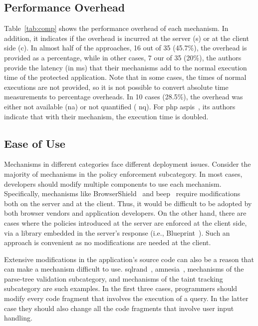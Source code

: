 \documentclass[conference]{IEEEtran}
\begin{document}
\subsection{Performance Overhead}

Table~\ref{tab:comp} shows the performance overhead of each mechanism.
In addition, it indicates if the overhead is incurred at the
server ({\sc s}) or at the client side ({\sc c}). In almost half of
the approaches, 16 out of 35 (45.7\%), the overhead is provided as a
percentage, while in other cases, 7 our of 35 (20\%), the authors
provide the latency (in ms) that their mechanisms add to the
normal execution time of the protected application. Note that in some
cases, the times of normal executions are not provided,
so it is not possible to convert absolute
time measurements to percentage overheads. In 10 cases (28.5\%), the
overhead was either not available ({\sc na}) or not quantified ({\sc
  nq}). For {\sc php aspis}~\cite{PMP11}, its authors indicate that with
their mechanism, the execution time is doubled.

\subsection{Ease of Use}
\label{sec:deploy2}

Mechanisms in different categories face different deployment issues.
Consider the majority of mechanisms in the policy enforcement
subcategory. In most cases, developers should modify multiple
components to use each mechanism. Specifically, mechanisms like
BrowserShield~\cite{RDWDE07} and {\sc beep}~\cite{TNH07}
require modifications both on the server
and at the client. Thus, it would be difficult to be
adopted by both browser vendors and application developers. On the
other hand, there are cases where the policies introduced at the
server are enforced at the client side, via a library embedded in the
server's response (i.e., Blueprint~\cite{LV09}).
Such an approach is convenient
as no modifications are needed at the client.

Extensive modifications in the application's source
code can also be a reason that can make a mechanism
difficult to use. {\sc sql}rand~\cite{BK04},
{\sc amnesia}~\cite{HO06},
mechanisms of the parse-tree validation
subcategory, and mechanisms of the taint
tracking subcategory are such examples.
In the first three cases, programmers should modify every
code fragment that involves the execution of a query.
In the latter case they should also change
all the code fragments that involve user input handling. 
\end{document}

